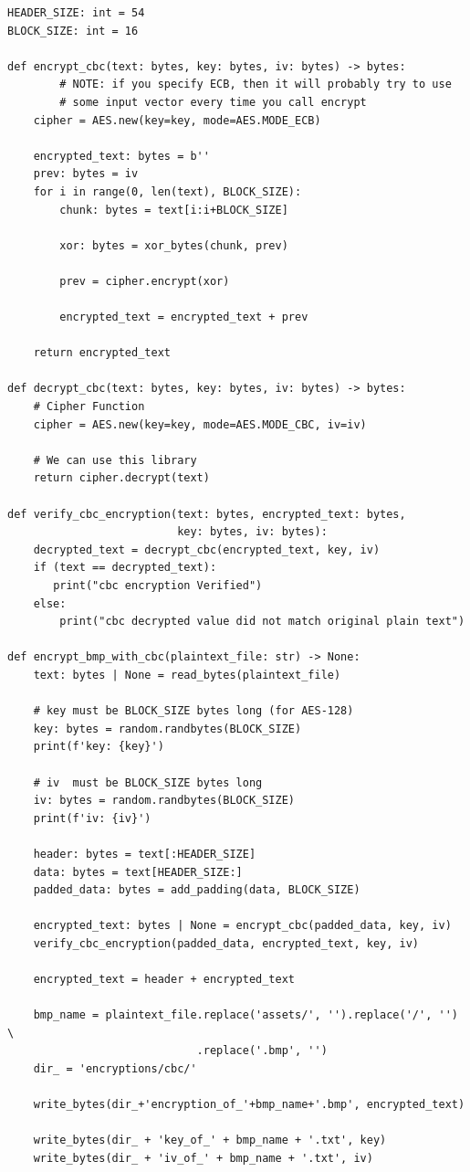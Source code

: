 \documentclass[11pt]{article}
\begin{document}
\begin{framed}
\begin{verbatim}
HEADER_SIZE: int = 54
BLOCK_SIZE: int = 16

def encrypt_cbc(text: bytes, key: bytes, iv: bytes) -> bytes:
		# NOTE: if you specify ECB, then it will probably try to use
		# some input vector every time you call encrypt
    cipher = AES.new(key=key, mode=AES.MODE_ECB)

    encrypted_text: bytes = b''
    prev: bytes = iv
    for i in range(0, len(text), BLOCK_SIZE):
        chunk: bytes = text[i:i+BLOCK_SIZE]

        xor: bytes = xor_bytes(chunk, prev)

        prev = cipher.encrypt(xor) 

        encrypted_text = encrypted_text + prev

    return encrypted_text 

def decrypt_cbc(text: bytes, key: bytes, iv: bytes) -> bytes:
    # Cipher Function
    cipher = AES.new(key=key, mode=AES.MODE_CBC, iv=iv)
    
    # We can use this library
    return cipher.decrypt(text)

def verify_cbc_encryption(text: bytes, encrypted_text: bytes,
                          key: bytes, iv: bytes):
    decrypted_text = decrypt_cbc(encrypted_text, key, iv)
    if (text == decrypted_text):
       print("cbc encryption Verified")
    else:
        print("cbc decrypted value did not match original plain text")

def encrypt_bmp_with_cbc(plaintext_file: str) -> None:
    text: bytes | None = read_bytes(plaintext_file)

    # key must be BLOCK_SIZE bytes long (for AES-128)
    key: bytes = random.randbytes(BLOCK_SIZE)
    print(f'key: {key}')

    # iv  must be BLOCK_SIZE bytes long
    iv: bytes = random.randbytes(BLOCK_SIZE)
    print(f'iv: {iv}')
    
    header: bytes = text[:HEADER_SIZE]
    data: bytes = text[HEADER_SIZE:]
    padded_data: bytes = add_padding(data, BLOCK_SIZE)

    encrypted_text: bytes | None = encrypt_cbc(padded_data, key, iv)    
    verify_cbc_encryption(padded_data, encrypted_text, key, iv)

    encrypted_text = header + encrypted_text

    bmp_name = plaintext_file.replace('assets/', '').replace('/', '') \
                             .replace('.bmp', '')
    dir_ = 'encryptions/cbc/'

    write_bytes(dir_+'encryption_of_'+bmp_name+'.bmp', encrypted_text)

    write_bytes(dir_ + 'key_of_' + bmp_name + '.txt', key)
    write_bytes(dir_ + 'iv_of_' + bmp_name + '.txt', iv)
\end{verbatim}
\end{framed}
\end{document}
